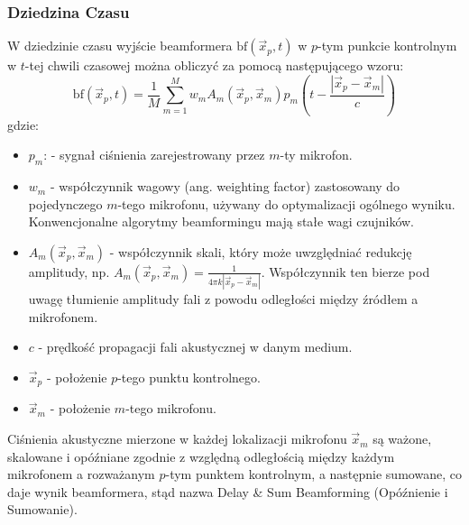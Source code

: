 \documentclass[12pt]{article}
\begin{document}
\subsubsection{Dziedzina Czasu}
W dziedzinie czasu wyjście beamformera $\text{bf}(\vec{x}_p, t)$ w $p$-tym punkcie kontrolnym w $t$-tej chwili czasowej można obliczyć za pomocą następującego wzoru:
\begin{equation}
\label{eq:das_time}
\text{bf}(\vec{x}_p, t) = \frac{1}{M} \sum_{m=1}^{M} w_m A_m(\vec{x}_p, \vec{x}_m) p_m \left( t - \frac{|\vec{x}_p - \vec{x}_m|}{c} \right)
\end{equation}
gdzie:
\begin{itemize}
    \item $p_m$: - sygnał ciśnienia zarejestrowany przez $m$-ty mikrofon.
    \item $w_m$ - współczynnik wagowy (ang. weighting factor) zastosowany do pojedynczego $m$-tego mikrofonu, używany do optymalizacji ogólnego wyniku. Konwencjonalne algorytmy beamformingu mają stałe wagi czujników.
    \item $A_m(\vec{x}_p, \vec{x}_m)$ - współczynnik skali, który może uwzględniać redukcję amplitudy, np. $A_m(\vec{x}_p, \vec{x}_m) = \frac{1}{4\pi k |\vec{x}_p - \vec{x}_m|}$. Współczynnik ten bierze pod uwagę tłumienie amplitudy fali z powodu odległości między źródłem a mikrofonem.
    \item $c$ - prędkość propagacji fali akustycznej w danym medium.
    \item $\vec{x}_p$ - położenie $p$-tego punktu kontrolnego.
    \item $\vec{x}_m$ - położenie $m$-tego mikrofonu.
\end{itemize}
Ciśnienia akustyczne mierzone w każdej lokalizacji mikrofonu $\vec{x}_m$ są ważone, skalowane i opóźniane zgodnie z względną odległością między każdym mikrofonem a rozważanym $p$-tym punktem kontrolnym, a następnie sumowane, co daje wynik beamformera, stąd nazwa Delay \& Sum Beamforming (Opóźnienie i Sumowanie).
\end{document}
